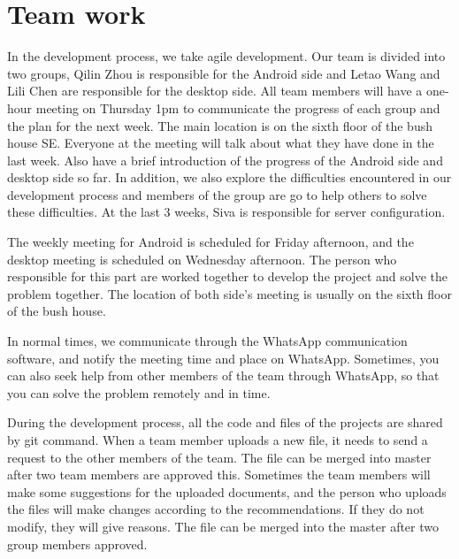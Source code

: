 \documentclass{article}
\begin{document}
\maketitle

\section{Team work}

In the development process, we take agile development. Our team is divided into two groups, Qilin Zhou is responsible for the Android side and Letao Wang and Lili Chen are responsible for the desktop side. All team members will have a one-hour meeting on Thursday 1pm to communicate the progress of each group and the plan for the next week. The main location is on the sixth floor of the bush house SE. Everyone at the meeting will talk about what they have done in the last week. Also have a brief introduction of the progress of the Android side and desktop side so far. In addition, we also explore the difficulties encountered in our development process and members of the group are go to help others to solve these difficulties. At the last 3 weeks, Siva is responsible for server configuration.\newline

The weekly meeting for Android is scheduled for Friday afternoon, and the desktop meeting is scheduled on Wednesday afternoon. The person who responsible for this part are worked together to develop the project and solve the problem together. The location of both side’s meeting is usually on the sixth floor of the bush house.\newline

In normal times, we communicate through the WhatsApp communication software, and notify the meeting time and place on WhatsApp. Sometimes, you can also seek help from other members of the team through WhatsApp, so that you can solve the problem remotely and in time.\newline

During the development process, all the code and files of the projects are shared by git command. When a team member uploads a new file, it needs to send a request to the other members of the team. The file can be merged into master after two team members are approved this. Sometimes the team members will make some suggestions for the uploaded documents, and the person who uploads the files will make changes according to the recommendations. If they do not modify, they will give reasons. The file can be merged into the master after two group members approved.\newline
\end{document}
